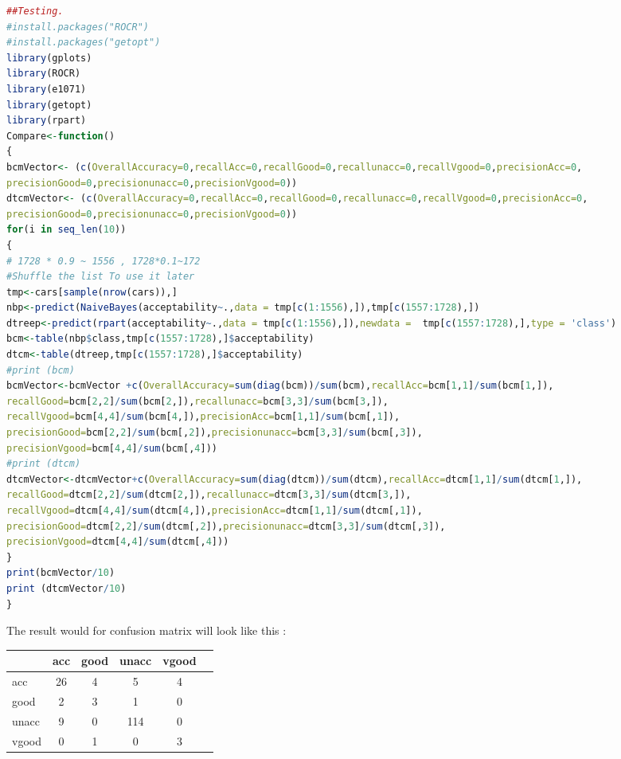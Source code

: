 \documentclass{article}
\begin{document}
\begin{lstlisting}[language=R]
##Testing.
#install.packages("ROCR")
#install.packages("getopt")
library(gplots)
library(ROCR)
library(e1071)
library(getopt)
library(rpart)
Compare<-function()
{
bcmVector<- (c(OverallAccuracy=0,recallAcc=0,recallGood=0,recallunacc=0,recallVgood=0,precisionAcc=0,
precisionGood=0,precisionunacc=0,precisionVgood=0))
dtcmVector<- (c(OverallAccuracy=0,recallAcc=0,recallGood=0,recallunacc=0,recallVgood=0,precisionAcc=0,
precisionGood=0,precisionunacc=0,precisionVgood=0))
for(i in seq_len(10))
{
# 1728 * 0.9 ~ 1556 , 1728*0.1~172
#Shuffle the list To use it later
tmp<-cars[sample(nrow(cars)),]
nbp<-predict(NaiveBayes(acceptability~.,data = tmp[c(1:1556),]),tmp[c(1557:1728),])
dtreep<-predict(rpart(acceptability~.,data = tmp[c(1:1556),]),newdata =  tmp[c(1557:1728),],type = 'class')
bcm<-table(nbp$class,tmp[c(1557:1728),]$acceptability)
dtcm<-table(dtreep,tmp[c(1557:1728),]$acceptability)
#print (bcm)
bcmVector<-bcmVector +c(OverallAccuracy=sum(diag(bcm))/sum(bcm),recallAcc=bcm[1,1]/sum(bcm[1,]),
recallGood=bcm[2,2]/sum(bcm[2,]),recallunacc=bcm[3,3]/sum(bcm[3,]),
recallVgood=bcm[4,4]/sum(bcm[4,]),precisionAcc=bcm[1,1]/sum(bcm[,1]),
precisionGood=bcm[2,2]/sum(bcm[,2]),precisionunacc=bcm[3,3]/sum(bcm[,3]),
precisionVgood=bcm[4,4]/sum(bcm[,4]))
#print (dtcm)
dtcmVector<-dtcmVector+c(OverallAccuracy=sum(diag(dtcm))/sum(dtcm),recallAcc=dtcm[1,1]/sum(dtcm[1,]),
recallGood=dtcm[2,2]/sum(dtcm[2,]),recallunacc=dtcm[3,3]/sum(dtcm[3,]),
recallVgood=dtcm[4,4]/sum(dtcm[4,]),precisionAcc=dtcm[1,1]/sum(dtcm[,1]),
precisionGood=dtcm[2,2]/sum(dtcm[,2]),precisionunacc=dtcm[3,3]/sum(dtcm[,3]),
precisionVgood=dtcm[4,4]/sum(dtcm[,4]))
}
print(bcmVector/10)
print (dtcmVector/10)
}
\end{lstlisting}
The result would for confusion matrix will look like this :\\ 
\begin{tabular}{|l|*{5}{c|}}
	\hline
&acc&good&unacc&vgood\\
\hline
acc&26&4&5&4\\ \hline
good&2&3&1&0\\ \hline
unacc&9&0&114&0\\ \hline
vgood&0&1&0&3\\ \hline
\end{tabular}\\
\end{document}
